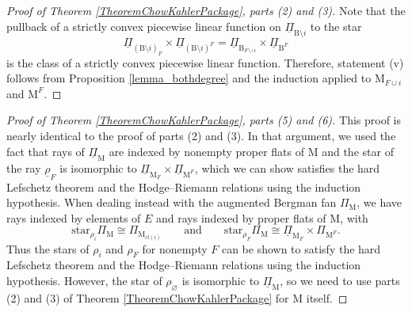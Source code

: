 \documentclass[11pt,reqno]{amsart}
\theoremstyle{definition}
\theoremstyle{remark}
\renewcommand{\(}{\left(}
\renewcommand{\)}{\right)}
\newcommand{\<}{\left<}
\renewcommand{\>}{\right>}
\renewcommand{\and}{\qquad\text{and}\qquad}
\begin{document}
\begin{proof}[Proof of Theorem \ref{TheoremChowKahlerPackage}, parts (2) and (3)]
Note that the pullback of a strictly convex piecewise linear function on $\underline{\Pi}_{\mathrm{B} \setminus i}$ to the star 
\[
\underline{\Pi}_{(\mathrm{B}\setminus i)_{F}} \times \underline{\Pi}_{(\mathrm{B} \setminus i)^F} = \underline{\Pi}_{\mathrm{B}_{F \cup i}} \times \underline{\Pi}_{\mathrm{B}^F} 
\]
 is the class of a strictly convex piecewise linear function.
Therefore,
statement (v) follows from Proposition \ref{lemma_bothdegree} and the induction applied to $\mathrm{M}_{F \cup i}$ and $\mathrm{M}^F$.
\end{proof}

\begin{proof}[Proof of Theorem \ref{TheoremChowKahlerPackage}, parts (5) and (6)]
This proof is nearly identical to the proof of parts (2) and (3).  In that argument, we used the fact that rays of $\underline{\Pi}_{\mathrm{M}}$
are indexed by nonempty proper flats of $\mathrm{M}$ and the star of the ray $\underline{\rho}_F$ is isomorphic
to $\underline{\Pi}_{\mathrm{M}_F}\times\underline{\Pi}_{\mathrm{M}^F}$, which we can show satisfies the hard Lefschetz
theorem and the Hodge--Riemann relations using the induction hypothesis.
When dealing instead with the augmented Bergman fan $\Pi_{\mathrm{M}}$, we have rays indexed by elements of $E$ and rays
indexed by proper flats of $\mathrm{M}$, with 
$$\text{star}_{\rho_i} \Pi_\mathrm{M} \cong \Pi_{\mathrm{M}_{\text{cl}(i)}} \and
\text{star}_{\rho_F} \Pi_\mathrm{M}\cong\underline{\Pi}_{\mathrm{M}_{F}}\times \Pi_{\mathrm{M}^F}.$$
Thus the stars of $\rho_i$ and $\rho_F$ for nonempty $F$ can be shown to satisfy the hard Lefschetz
theorem and the Hodge--Riemann relations using the induction hypothesis.  However, the star of $\rho_\varnothing$
is isomorphic to $\underline{\Pi}_{\mathrm{M}}$, so we need to use parts (2) and (3) of Theorem \ref{TheoremChowKahlerPackage}
for $\mathrm{M}$ itself.
\end{proof}
\end{document}
